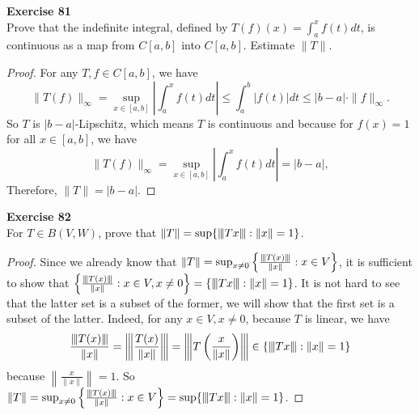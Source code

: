 \documentclass[12pt, a4paper]{article}
\theoremstyle{plain}
\newcommand{\vertiii}[1]{{\left\vert\kern-0.25ex\left\vert\kern-0.25ex\left\vert #1 
    \right\vert\kern-0.25ex\right\vert\kern-0.25ex\right\vert}}
\newenvironment{exercise}[2][Exercise]
    { \begin{mdframed}[backgroundcolor=gray!20] \textbf{#1 #2} \\}
    {  \end{mdframed}}
\begin{document}
\begin{exercise}{81}
Prove that the indefinite integral, defined by $T(f)(x)=\int_{a}^{x}{f(t)dt}$, is continuous as a map from $C[a,b]$ into $C[a,b]$. Estimate $\|T\|$.
\end{exercise}
	\begin{proof}
	For any $T,f\in C[a,b]$, we have
	\[
	\|T(f)\|_\infty=\sup_{x\in [a,b]}\left|\int_{a}^{x}{f(t)dt}\right|\leq \int_{a}^{b}{|f(t)|dt}\leq |b-a|\cdot \|f\|_\infty.
	\]
	So $T$ is $|b-a|$-Lipschitz, which means $T$ is continuous and because for $f(x)=1$ for all $x\in [a,b]$, we have 
	\[
	\|T(f)\|_\infty=\sup_{x\in [a,b]}\left|\int_{a}^{x}{f(t)dt}\right|=|b-a|,
	\]
	Therefore, $\|T\|=|b-a|$.
	\end{proof}
	
\begin{exercise}{82}
For $T\in B(V,W)$, prove that $\|T\|=\sup\{\vertiii{Tx}:\|x\|=1\}$.
\end{exercise}
	\begin{proof}
	Since we already know that $\|T\|=\sup_{x\neq 0}\left\{\frac{\vertiii{T(x)}}{\|x\|}:x\in V\right\}$, it is sufficient to show that $\left\{\frac{\vertiii{T(x)}}{\|x\|}:x\in V,x\neq 0\right\} = \{\vertiii{Tx}:\|x\|=1\}$. It is not hard to see that the latter set is a subset of the former, we will show that the first set is a subset of the latter. Indeed, for any $x\in V,x\neq 0$, because $T$ is linear, we have
	\[
	\frac{\vertiii{T(x)}}{\|x\|}=\vertiii{\frac{T(x)}{\|x\|}}=\vertiii{T\left(\frac{x}{\|x\|}\right)}\in \{\vertiii{Tx}:\|x\|=1\}
	\]
	because $\left\|\frac{x}{\|x\|}\right\|=1$. So $\|T\|=\sup_{x\neq 0}\left\{\frac{\vertiii{T(x)}}{\|x\|}:x\in V\right\}=\sup\{\vertiii{Tx}:\|x\|=1\}$.
	\end{proof}

\pagebreak
\end{document}
